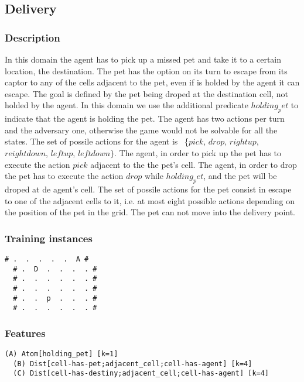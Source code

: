 \documentclass[a4paper]{article}
\begin{document}
\subsection{Delivery}
\subsubsection{Description}

In this domain the agent has to pick up a missed pet and take it to a certain location, the destination. The pet has the option on its turn to escape from its captor to any of the cells adjacent to the pet, even if is holded by the agent it can escape. The goal is defined by the pet being droped at the destination cell, not holded by the agent. In this domain we use the additional predicate $holding_pet$ to indicate that the agent is holding the pet. The agent has two actions per turn and the adversary one, otherwise the game would not be solvable for all the states. The set of possile actions for the agent is ~\{$pick$, $drop$, $rightup$, $reightdown$, $leftup$, $leftdown\}$. The agent, in order to pick up the pet has to execute the action $pick$ adjacent to the the pet's cell. The agent, in order to drop the pet has to execute the action $drop$ while $holding_pet$, and the pet will be droped at de agent's cell. The set of possile actions for the pet consist in escape to one of the adjacent cells to it, i.e. at most eight possible actions depending on the position of the pet in the grid. The pet can not move into the delivery point.

\subsubsection{Training instances}
\begin{Verbatim}[fontsize=\footnotesize]
  # .  .  .  .  .  A #
  # .  D  .  .  .  . #
  # .  .  .  .  .  . #
  # .  .  .  .  .  . #
  # .  .  p  .  .  . #
  # .  .  .  .  .  . #
\end{Verbatim}

\subsubsection{Features}
\begin{Verbatim}[fontsize=\footnotesize]
  (A) Atom[holding_pet] [k=1]
  (B) Dist[cell-has-pet;adjacent_cell;cell-has-agent] [k=4]
  (C) Dist[cell-has-destiny;adjacent_cell;cell-has-agent] [k=4]
\end{Verbatim}
\end{document}
